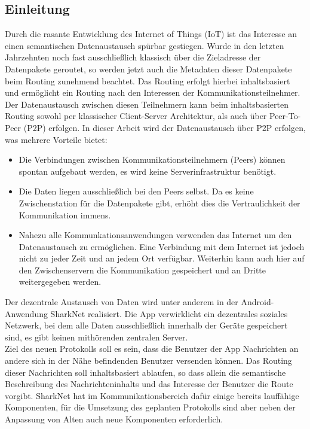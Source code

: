 


\subsection{Einleitung}
Durch die rasante Entwicklung des Internet of Things (IoT) ist das Interesse an einen semantischen Datenaustausch spürbar gestiegen. Wurde in den letzten Jahrzehnten noch fast ausschließlich klassisch über die Zieladresse der Datenpakete geroutet, so werden jetzt auch die Metadaten dieser Datenpakete beim Routing zunehmend beachtet. Das Routing erfolgt hierbei inhaltsbasiert und ermöglicht ein Routing nach den Interessen der Kommunikationsteilnehmer. Der Datenaustausch zwischen diesen Teilnehmern kann beim inhaltsbasierten Routing sowohl per klassischer Client-Server Architektur, als auch über Peer-To-Peer (P2P) erfolgen. In dieser Arbeit wird der Datenaustausch über P2P erfolgen, was mehrere Vorteile bietet:
\begin{itemize}
\item Die Verbindungen zwischen Kommunikationsteilnehmern (Peers) können spontan aufgebaut werden, es wird keine Serverinfrastruktur benötigt.
\item Die Daten liegen ausschließlich bei den Peers selbst. Da es keine Zwischenstation für die Datenpakete gibt, erhöht dies die Vertraulichkeit der Kommunikation immens. 
\item Nahezu alle Kommunkationsanwendungen verwenden das Internet um den Datenaustausch zu ermöglichen. Eine Verbindung mit dem Internet ist jedoch nicht zu jeder Zeit und an jedem Ort verfügbar. Weiterhin kann auch hier auf den Zwischenservern die Kommunikation gespeichert und an Dritte weitergegeben werden.
\end{itemize}  
Der dezentrale Austausch von Daten wird unter anderem in der Android-Anwendung SharkNet realisiert. Die App verwirklicht ein dezentrales soziales Netzwerk, bei dem alle Daten ausschließlich innerhalb der Geräte gespeichert sind, es gibt keinen mithörenden zentralen Server. \\Ziel des neuen Protokolls soll es sein, dass die Benutzer der App Nachrichten an andere sich in der Nähe befindenden Benutzer versenden können. Das Routing dieser Nachrichten soll inhaltsbasiert ablaufen, so dass allein die semantische Beschreibung des Nachrichteninhalts und das Interesse der Benutzer die Route vorgibt. SharkNet hat im Kommunikationsbereich dafür einige bereits lauffähige Komponenten, für die Umsetzung des geplanten Protokolls sind aber neben der Anpassung von Alten auch neue Komponenten erforderlich. 
\newline [...]
\newpage
